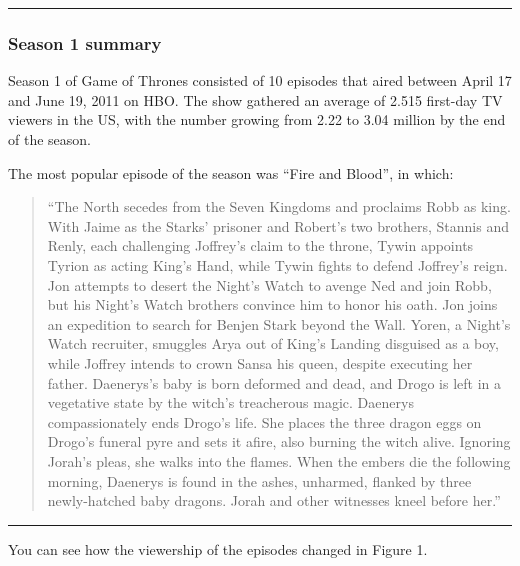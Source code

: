 \documentclass[
  11pt,
]{article}
\newenvironment{Shaded}{\begin{snugshade}}{\end{snugshade}}
\newcommand{\AttributeTok}[1]{\textcolor[rgb]{0.40,0.45,0.13}{#1}}
\newcommand{\DecValTok}[1]{\textcolor[rgb]{0.68,0.00,0.00}{#1}}
\newcommand{\FunctionTok}[1]{\textcolor[rgb]{0.28,0.35,0.67}{#1}}
\newcommand{\NormalTok}[1]{\textcolor[rgb]{0.00,0.23,0.31}{#1}}
\newcommand{\SpecialCharTok}[1]{\textcolor[rgb]{0.37,0.37,0.37}{#1}}
\newcommand{\StringTok}[1]{\textcolor[rgb]{0.13,0.47,0.30}{#1}}
\begin{document}
\begin{center}\rule{0.5\linewidth}{0.5pt}\end{center}

\hypertarget{season-1-summary}{%
\subsubsection{Season 1 summary}\label{season-1-summary}}

Season 1 of Game of Thrones consisted of 10 episodes that aired between
April 17 and June 19, 2011 on HBO. The show gathered an average of 2.515
first-day TV viewers in the US, with the number growing from 2.22 to
3.04 million by the end of the season.

The most popular episode of the season was ``Fire and Blood'', in which:

\begin{quote}
``The North secedes from the Seven Kingdoms and proclaims Robb as king.
With Jaime as the Starks' prisoner and Robert's two brothers, Stannis
and Renly, each challenging Joffrey's claim to the throne, Tywin
appoints Tyrion as acting King's Hand, while Tywin fights to defend
Joffrey's reign. Jon attempts to desert the Night's Watch to avenge Ned
and join Robb, but his Night's Watch brothers convince him to honor his
oath. Jon joins an expedition to search for Benjen Stark beyond the
Wall. Yoren, a Night's Watch recruiter, smuggles Arya out of King's
Landing disguised as a boy, while Joffrey intends to crown Sansa his
queen, despite executing her father. Daenerys's baby is born deformed
and dead, and Drogo is left in a vegetative state by the witch's
treacherous magic. Daenerys compassionately ends Drogo's life. She
places the three dragon eggs on Drogo's funeral pyre and sets it afire,
also burning the witch alive. Ignoring Jorah's pleas, she walks into the
flames. When the embers die the following morning, Daenerys is found in
the ashes, unharmed, flanked by three newly-hatched baby dragons. Jorah
and other witnesses kneel before her.''
\end{quote}

\begin{center}\rule{0.5\linewidth}{0.5pt}\end{center}

You can see how the viewership of the episodes changed in Figure 1.

\begin{Shaded}
\end{Shaded}
\end{document}
